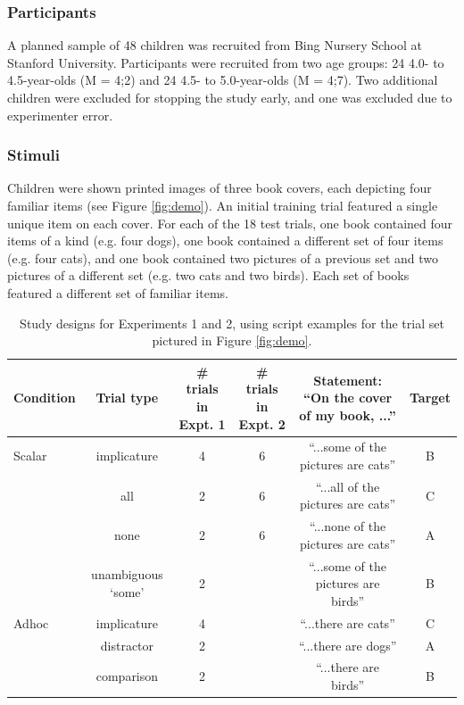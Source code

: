 \documentclass[10pt,letterpaper]{article}
\begin{document}
\subsubsection{Participants}

A planned sample of 48 children was recruited from Bing Nursery School at Stanford University.  Participants were recruited from two age groups: 24 4.0- to 4.5-year-olds (M = 4;2) and 24 4.5- to 5.0-year-olds (M = 4;7). Two additional children were excluded for stopping the study early, and one was excluded due to experimenter error. 

\subsubsection{Stimuli}

Children were shown printed images of three book covers, each depicting four familiar items (see Figure \ref{fig:demo}). An initial training trial featured a single unique item on each cover. For each of the 18 test trials, one book contained four items of a kind (e.g. four dogs), one book contained a different set of four items (e.g. four cats), and one book contained two pictures of a previous set and two pictures of a different set (e.g. two cats and two birds). Each set of books featured a different set of familiar items. 


 \begin{table} [t]
   \caption{Study designs for Experiments 1 and 2, using script examples for the trial set pictured in Figure \ref{fig:demo}.  \label{tab:scripts} } 
   \begin{center} 
     \begin{tabular}{lccccc} 
                      \hline 
       \null   Condition  & Trial type & \# trials in Expt. 1 & \# trials in Expt. 2 & Statement: ``On the cover of my book, ...'' & Target   \\ 
       \hline  
            Scalar & implicature & 4 & 6 &  ``...some of the pictures are cats'' & B	 \\ 
          & all  & 2 &  6 & ``...all of the pictures are cats'' & C		                 \\
           & none  & 2 & 6 & ``...none of the pictures are cats'' & A			\\ 
               & unambiguous `some' 	&  2 &  & ``...some of the pictures are birds'' & B					        \\ 
	\hline
	    Adhoc       & implicature & 4 &  & ``...there are cats'' & C 		\\ 
	     & distractor & 2 &  & ``...there are dogs'' & A	     \\ 
          & comparison & 2 &  & ``...there are birds'' & B 	   \\
       \hline 
     \end{tabular} 
  \end{center}
 \end{table}
 
\end{document}
